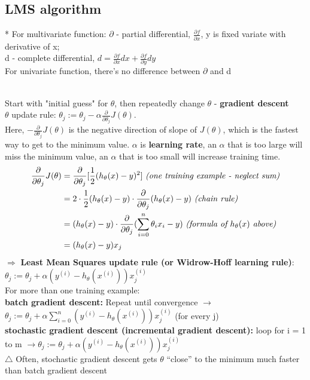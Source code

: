 \documentclass{article}
\begin{document}
\subsection{LMS algorithm}
\begin{elaboration}* For multivariate function: $\partial$ - partial differential, $\frac{\partial f}{\partial x}$, y is fixed variate with derivative of x;\\
\indent d - complete differential, $d = \frac{\partial f}{\partial x}dx + \frac{\partial f}{\partial y}dy$\\
For univariate function, there's no difference between $\partial$ and d
\end{elaboration}\\
Start with "initial guess" for $\theta$, then repeatedly change $\theta$ - \textbf{gradient descent}\\
$\theta$ update rule: $\theta_j:=\theta_j - \alpha \frac{\partial}{\partial \theta_j}J(\theta)$.\\
Here, $-\frac{\partial}{\partial \theta_j}J(\theta)$ is the negative direction of slope of $J(\theta)$, which is the fastest way to get to the minimum value. $\alpha$ is \textbf{learning rate}, an $\alpha$ that is too large will miss the minimum value, an $\alpha$ that is too small will increase training time.\\
\begin{equation}\nonumber
   \begin{aligned}
       \frac{\partial}{\partial \theta_j}J(\theta) &= \frac{\partial}{\partial \theta_j}[\frac{1}{2}(h_\theta(x) - y)^2] \text{  \textit{(one training example - neglect sum)}}\\
         &=2\cdot\frac{1}{2}(h_\theta(x) - y)\cdot\frac{\partial}{\partial \theta_j}(h_\theta(x) - y)\text{  \textit{(chain rule)}}\\
         &=(h_\theta(x) - y)\cdot\frac{\partial}{\partial \theta_j}(\sum^n_{i=0}\theta_ix_i - y)\text{  \textit{(formula of $h_\theta(x)$ above)}}\\
         &=(h_\theta(x) - y)x_j\\
   \end{aligned} 
\end{equation}
$\Rightarrow$ \textbf{Least Mean Squares update rule (or Widrow-Hoff learning rule)}: $\theta_j:=\theta_j + \alpha(y^{(i)} - h_\theta(x^{(i)}))x_j^{(i)}$\\

\noindent For more than one training example:\\
\indent \textbf{batch gradient descent:} Repeat until convergence $\rightarrow$ $\theta_j:=\theta_j + \alpha\sum^n_{i=0}(y^{(i)} - h_\theta(x^{(i)}))x_j^{(i)}$ (for every j)\\
\indent \textbf{stochastic gradient descent (incremental
gradient descent):} loop for i = 1 to m $\rightarrow \theta_j:=\theta_j + \alpha(y^{(i)} - h_\theta(x^{(i)}))x_j^{(i)}$\\
$\triangle$ Often, stochastic gradient descent gets $\theta$ “close” to the minimum much faster than batch gradient descent
\end{document}
